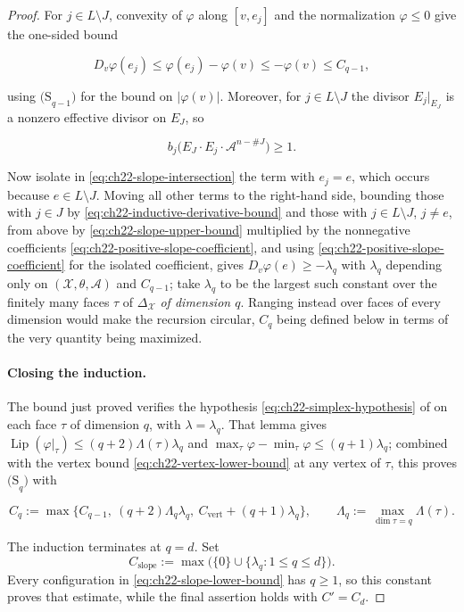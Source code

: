 \begin{proof}
For $j\in L\setminus J$, convexity of $\varphi$ along $[v,e_j]$ and
the normalization $\varphi\leq0$ give the one-sided bound

\[
             D_v\varphi(e_j)
             \leq\varphi(e_j)-\varphi(v)\leq-\varphi(v)\leq C_{q-1},
\tag{22.49}\label{eq:ch22-slope-upper-bound}
\]

using $\mathrm{(S}_{q-1}\mathrm{)}$ for the bound on $|\varphi(v)|$.
Moreover, for $j\in L\setminus J$ the divisor $E_j|_{E_J}$ is a nonzero
effective divisor on $E_J$, so

\[
 b_j\bigl(E_J\cdot E_j\cdot\mathcal A^{n-\#J}\bigr)\geq1 .
\tag{22.50}\label{eq:ch22-positive-slope-coefficient}
\]

Now isolate in \eqref{eq:ch22-slope-intersection} the term with
$e_j=e$, which occurs because $e\in L\setminus J$.  Moving all other
terms to the right-hand side, bounding those with $j\in J$ by
\eqref{eq:ch22-inductive-derivative-bound} and those with
$j\in L\setminus J$, $j\neq e$, from above by
\eqref{eq:ch22-slope-upper-bound} multiplied by the nonnegative coefficients
\eqref{eq:ch22-positive-slope-coefficient}, and using
\eqref{eq:ch22-positive-slope-coefficient} for the isolated coefficient,
gives $D_v\varphi(e)\geq-\lambda_q$ with $\lambda_q$ depending only on
$(\mathcal X,\theta,\mathcal A)$ and $C_{q-1}$; take $\lambda_q$ to be
the largest such constant over the finitely many faces $\tau$ of
$\Delta_{\mathcal X}$ \emph{of dimension $q$}.  Ranging instead over
faces of every dimension would make the recursion circular, $C_{q}$ being
defined below in terms of the very quantity being maximized.

\paragraph{Closing the induction.}
The bound just proved verifies the hypothesis
\eqref{eq:ch22-simplex-hypothesis} of  on each face
$\tau$ of dimension $q$, with $\lambda=\lambda_q$.  That
lemma gives
$\operatorname{Lip}(\varphi|_\tau)\leq(q+2)\Lambda(\tau)\lambda_q$
and $\max_\tau\varphi-\min_\tau\varphi\leq(q+1)\lambda_q$;
combined with the vertex bound \eqref{eq:ch22-vertex-lower-bound} at any
vertex of $\tau$, this proves $\mathrm{(S}_q\mathrm{)}$ with

\[
 C_q:=\max\bigl\{C_{q-1},\ (q+2)\Lambda_q\lambda_q,\
       C_{\mathrm{vert}}+(q+1)\lambda_q\bigr\},
 \qquad
 \Lambda_q:=\max_{\dim\tau=q}\Lambda(\tau).
\tag{22.51}\label{eq:ch22-inductive-constant}
\]

The induction terminates at $q=d$.  Set
\[
 C_{\mathrm{slope}}
 :=\max\bigl(\{0\}\cup\{\lambda_q:1\leq q\leq d\}\bigr).
\]
Every configuration in \eqref{eq:ch22-slope-lower-bound} has
$q\geq1$, so this constant proves that estimate, while the final assertion
holds with $C'=C_d$.
\end{proof}

